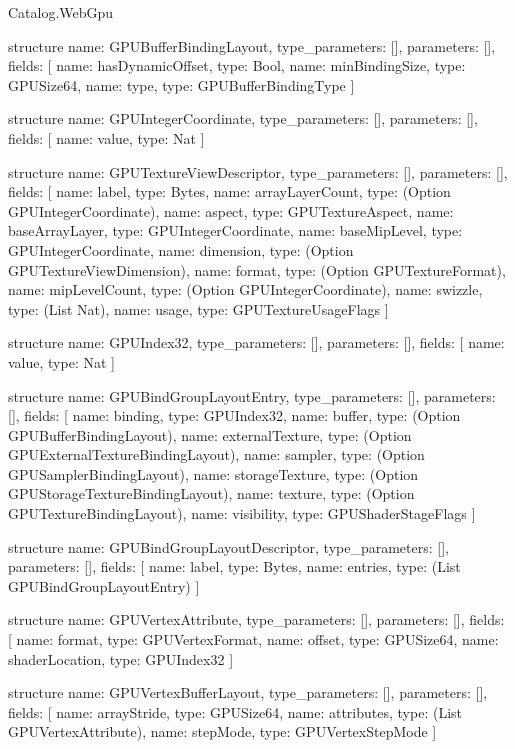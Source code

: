 \begin{lexlean}{Catalog.WebGpu}
\begin{semanticmodule}
structure{
  name: GPUBufferBindingLayout,
  type_parameters: [],
  parameters: [],
  fields: [
    {name: hasDynamicOffset, type: Bool},
    {name: minBindingSize, type: GPUSize64},
    {name: type, type: GPUBufferBindingType}
  ]
}

structure{
  name: GPUIntegerCoordinate,
  type_parameters: [],
  parameters: [],
  fields: [
    {name: value, type: Nat}
  ]
}

structure{
  name: GPUTextureViewDescriptor,
  type_parameters: [],
  parameters: [],
  fields: [
    {name: label, type: Bytes},
    {name: arrayLayerCount, type: (Option GPUIntegerCoordinate)},
    {name: aspect, type: GPUTextureAspect},
    {name: baseArrayLayer, type: GPUIntegerCoordinate},
    {name: baseMipLevel, type: GPUIntegerCoordinate},
    {name: dimension, type: (Option GPUTextureViewDimension)},
    {name: format, type: (Option GPUTextureFormat)},
    {name: mipLevelCount, type: (Option GPUIntegerCoordinate)},
    {name: swizzle, type: (List Nat)},
    {name: usage, type: GPUTextureUsageFlags}
  ]
}

structure{
  name: GPUIndex32,
  type_parameters: [],
  parameters: [],
  fields: [
    {name: value, type: Nat}
  ]
}

structure{
  name: GPUBindGroupLayoutEntry,
  type_parameters: [],
  parameters: [],
  fields: [
    {name: binding, type: GPUIndex32},
    {name: buffer, type: (Option GPUBufferBindingLayout)},
    {name: externalTexture, type: (Option GPUExternalTextureBindingLayout)},
    {name: sampler, type: (Option GPUSamplerBindingLayout)},
    {name: storageTexture, type: (Option GPUStorageTextureBindingLayout)},
    {name: texture, type: (Option GPUTextureBindingLayout)},
    {name: visibility, type: GPUShaderStageFlags}
  ]
}

structure{
  name: GPUBindGroupLayoutDescriptor,
  type_parameters: [],
  parameters: [],
  fields: [
    {name: label, type: Bytes},
    {name: entries, type: (List GPUBindGroupLayoutEntry)}
  ]
}

structure{
  name: GPUVertexAttribute,
  type_parameters: [],
  parameters: [],
  fields: [
    {name: format, type: GPUVertexFormat},
    {name: offset, type: GPUSize64},
    {name: shaderLocation, type: GPUIndex32}
  ]
}

structure{
  name: GPUVertexBufferLayout,
  type_parameters: [],
  parameters: [],
  fields: [
    {name: arrayStride, type: GPUSize64},
    {name: attributes, type: (List GPUVertexAttribute)},
    {name: stepMode, type: GPUVertexStepMode}
  ]
}


\end{semanticmodule}
\end{lexlean}
